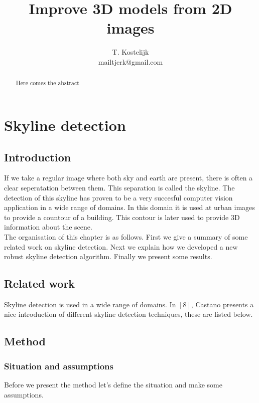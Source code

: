\documentclass[10pt]{article}
\title{\sc Improve 3D models from 2D images}
\author{T. Kostelijk\\mailtjerk@gmail.com}
\begin{document}
\maketitle

\begin{abstract}
Here comes the abstract
\end{abstract}


\section{Skyline detection}
 \subsection{Introduction}
If we take a regular image where both sky and earth are present, there
is often a clear seperatation between them. This separation is called the
skyline. %
The detection of this skyline has proven to be a very succesful computer vision
application in a wide range of domains. In this domain it is used at urban
images to provide a countour of a building. This contour is later used to
provide 3D information about the scene.\\
The organisation of this chapter is as follows.  First we give a summary of some
related work on skyline detection.  Next we explain how we developed a new
robust skyline detection algorithm.  Finally we present some results.

\subsection{Related work}
Skyline detection is used in a wide range of domains.
In $[8]$, Castano presents a nice introduction of different skyline
detection techniques, these are listed below.







\subsection{Method} %
\subsubsection{Situation and assumptions}
Before we present the method let's define the situation and make some
assumptions.\\
\end{document}
